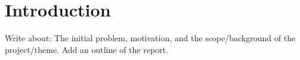 \chapter{Introduction}\label{cha:Introduction}
Write about: The initial problem, motivation, and the scope/background of the project/theme. Add an outline of the report.